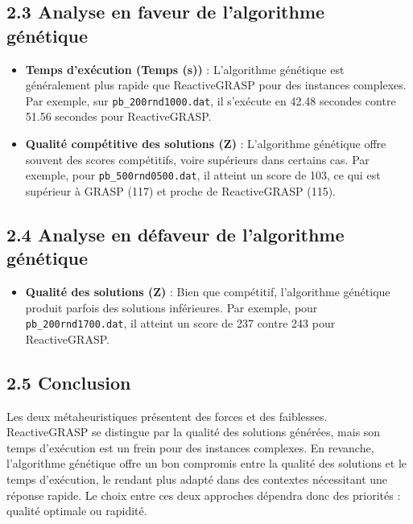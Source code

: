 \begin{minipage}
\subsection*{2.3 Analyse en faveur de l’algorithme génétique}

\begin{itemize}
    \item \textbf{Temps d’exécution (\textbf{Temps (s)})} : L’algorithme génétique est généralement plus rapide que ReactiveGRASP pour des instances complexes. Par exemple, sur \texttt{pb\_200rnd1000.dat}, il s’exécute en 42.48 secondes contre 51.56 secondes pour ReactiveGRASP.
    \item \textbf{Qualité compétitive des solutions (\textbf{Z})} : L’algorithme génétique offre souvent des scores compétitifs, voire supérieurs dans certains cas. Par exemple, pour \texttt{pb\_500rnd0500.dat}, il atteint un score de 103, ce qui est supérieur à GRASP (117) et proche de ReactiveGRASP (115).
\end{itemize}

\subsection*{2.4 Analyse en défaveur de l’algorithme génétique}

\begin{itemize}
    \item \textbf{Qualité des solutions (\textbf{Z})} : Bien que compétitif, l’algorithme génétique produit parfois des solutions inférieures. Par exemple, pour \texttt{pb\_200rnd1700.dat}, il atteint un score de 237 contre 243 pour ReactiveGRASP.
\end{itemize}

\subsection*{2.5 Conclusion}

Les deux métaheuristiques présentent des forces et des faiblesses. ReactiveGRASP se distingue par la qualité des solutions générées, mais son temps d’exécution est un frein pour des instances complexes. En revanche, l’algorithme génétique offre un bon compromis entre la qualité des solutions et le temps d’exécution, le rendant plus adapté dans des contextes nécessitant une réponse rapide. Le choix entre ces deux approches dépendra donc des priorités : qualité optimale ou rapidité.




\end{minipage}
